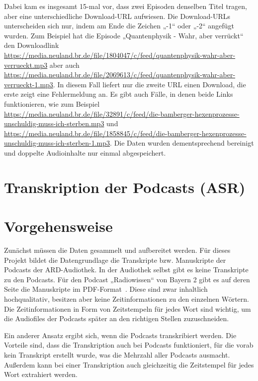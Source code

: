 Dabei kam es insgesamt 15-mal vor, dass zwei Episoden denselben Titel tragen, aber eine unterschiedliche Download-URL aufwiesen.
Die Download-URLs unterscheiden sich nur, indem am Ende die Zeichen „-1“ oder „-2“ angefügt wurden.
Zum Beispiel hat die Episode „Quantenphysik - Wahr, aber verrückt“ den Downloadlink \url{https://media.neuland.br.de/file/1804047/c/feed/quantenphysik-wahr-aber-verrueckt.mp3} aber auch \url{https://media.neuland.br.de/file/2069613/c/feed/quantenphysik-wahr-aber-verrueckt-1.mp3}.
In diesem Fall liefert nur die zweite URL einen Download, die erste zeigt eine Fehlermeldung an.
Es gibt auch Fälle, in denen beide Links funktionieren, wie zum Beispiel \url{https://media.neuland.br.de/file/32891/c/feed/die-bamberger-hexenprozesse-unschuldig-muss-ich-sterben.mp3} und \url{https://media.neuland.br.de/file/1858845/c/feed/die-bamberger-hexenprozesse-unschuldig-muss-ich-sterben-1.mp3}.
Die Daten wurden dementsprechend bereinigt und doppelte Audioinhalte nur einmal abgespeichert.

\section{Transkription der Podcasts (ASR)}

\section{Vorgehensweise}

Zunächst müssen die Daten gesammelt und aufbereitet werden.
Für dieses Projekt bildet die Datengrundlage die Transkripte bzw. Manuskripte der Podcasts der ARD-Audiothek.
In der Audiothek selbst gibt es keine Transkripte zu den Podcasts.
Für den Podcast „Radiowissen“ von Bayern 2 gibt es auf deren Seite die Manuskripte im PDF-Format~\cite{rundfunk2024}.
Diese sind zwar inhaltlich hochqualitativ,  besitzen aber keine Zeitinformationen zu den einzelnen Wörtern.
Die Zeitinformationen in Form von Zeitstempeln für jedes Wort sind wichtig, um die Audiofiles der Podcasts später an den richtigen Stellen zuzuschneiden.

Ein anderer Ansatz ergibt sich, wenn die Podcasts transkribiert werden.
Die Vorteile sind, dass die Transkription auch bei Podcasts funktioniert, für die vorab kein Transkript erstellt wurde, was die Mehrzahl aller Podcasts ausmacht.
Außerdem kann bei einer Transkription auch gleichzeitig die Zeitstempel für jedes Wort extrahiert werden.


